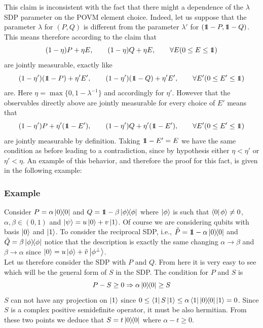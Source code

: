 \documentclass[10pt, a4paper]{amsart}
\begin{document}
This claim is inconsistent with the fact that there might a dependence of the $\lambda$ SDP parameter on the POVM element choice. Indeed, let us suppose that the parameter $\lambda$ for $(P,Q)$ is different from the parameter $\lambda'$ for $(\bbone - P, \bbone - Q)$.
This means therefore according to the claim that 
$$
(1-\eta)P + \eta E, \qquad
(1-\eta)Q + \eta E, \qquad \forall E( 0\leq E \leq \bbone)
$$
are jointly measurable, exactly like 
$$
(1-\eta')(\bbone -P) + \eta' E', \qquad
(1-\eta')(\bbone -Q) + \eta' E' , \qquad \forall E'( 0\leq E' \leq \bbone)
$$
are. Here $\eta = \max\{0, 1-\lambda^{-1}\}$ and accordingly for $\eta'$. However that the observables directly above are jointly measurable for every choice of $E'$ means that 
$$
(1-\eta')P + \eta' (\bbone - E'), \qquad
(1-\eta')Q + \eta'(\bbone- E') , \qquad \forall E'( 0\leq E' \leq \bbone)
$$
are jointly measurable by definition. Taking $\bbone - E' = E $ we have the same condition as before leading to a contradiction, since by hypothesis   either $\eta < \eta '$ or $\eta' <\eta$. An example of this behavior, and therefore the proof for this fact, is given in the following example:

\subsubsection{Example}
Consider $ P = \alpha \left| 0\right\rangle\!\!\left\langle 0\right|$ and $ Q = \bbone - \beta \projector{\phi}$ where $\left| \phi\right\rangle$ is such that $\left \langle 0 \right|\left.\! \phi\right\rangle\neq 0$, $\alpha, \beta \in (0,1)$ and $\left| \psi\right\rangle = u \left| 0\right\rangle + v\left| 1\right\rangle$. Of course we are considering qubits with basis $\left| 0\right\rangle$ and $\left| 1\right\rangle$. 
To consider the reciprocal SDP, i.e., $\tilde{P} = \bbone - \alpha \projector{0}$ and $\tilde{Q} = \beta \left| \phi\right\rangle\!\!\left\langle \phi\right|$ notice that the description is exactly the same changing $\alpha \to \beta$ and $\beta \to \alpha$ since $\left| 0\right\rangle = u\left| \phi\right\rangle + \tilde{v}\left| \phi^{\bot}\right\rangle$.\\
Let us therefore consider the SDP with $P$ and $Q$. 
From here it is very easy to see which will be the general form of $S$ in the SDP. The condition for $P$ and $S$ is 
$$
P - S \geq 0 \Rightarrow \alpha \left| 0\right\rangle\!\!\left\langle 0\right| \geq S
$$
$S$ can not have any projection on $\left| 1\right\rangle$ since $0 \leq  \left\langle 1\right| S \left| 1\right\rangle \leq \alpha \left\langle 1\right|\left| 0\right\rangle\!\!\left\langle 0\right|\left| 1\right\rangle = 0$. 
Since $S$ is a complex positive semidefinite operator, it must be also hermitian. From these two points we deduce that 
$S = t \left| 0\right\rangle\!\!\left\langle 0\right|$ where $\alpha - t\geq 0$. 
\end{document}
